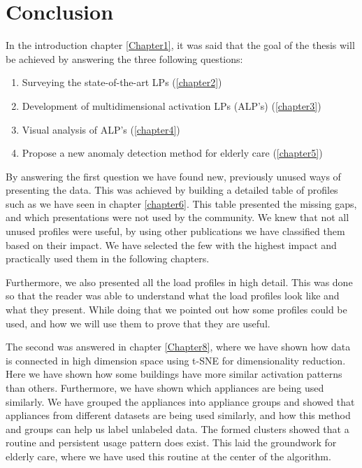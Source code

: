 
\chapter{Conclusion} %
\label{Chapter7} %

In the introduction chapter \ref{Chapter1}, it was said that the goal of the thesis will be achieved by answering the three following questions:


\begin{enumerate}
	\item Surveying the state-of-the-art LPs (\ref{chapter2})
	\item Development of multidimensional activation LPs (ALP's) (\ref{chapter3})
	\item Visual analysis of ALP's (\ref{chapter4})
	\item Propose a new anomaly detection method for elderly care (\ref{chapter5})
\end{enumerate}


By answering the first question we have found new, previously unused ways of presenting the data.
This was achieved by building a detailed table of profiles such as we have seen in chapter \ref{chapter6}.
This table presented the missing gaps, and which presentations were not used by the community.
We knew that not all unused profiles were useful, by using other publications we have classified them based on their impact. 
We have selected the few with the highest impact and practically used them in the following chapters.

Furthermore, we also presented all the load profiles in high detail. This was done so that the reader was able to understand what the load profiles look like and what they present.
While doing that we pointed out how some profiles could be used, and how we will use them to prove that they are useful. 

The second was answered in chapter \ref{Chapter8}, where we have shown how data is connected in high dimension space
using t-SNE for dimensionality reduction. Here we have shown how some buildings have more similar activation patterns than others.
Furthermore, we have shown which appliances are being used similarly. 
We have grouped the appliances into appliance groups and showed that appliances from different datasets are being used similarly, and how this method and groups can help us label unlabeled data. 
The formed clusters showed that a routine and persistent usage pattern does exist. This laid the groundwork for elderly care, where we have used this routine at the center of the algorithm.

